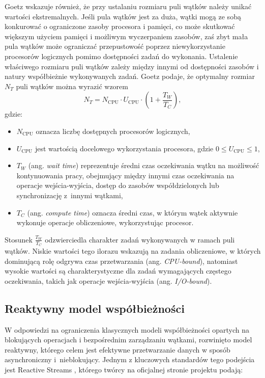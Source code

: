 Goetz wskazuje również, że przy ustalaniu rozmiaru puli wątków należy unikać wartości ekstremalnych. Jeśli pula wątków jest za duża, wątki mogą ze sobą konkurować o ograniczone zasoby procesora i pamięci, co może skutkować większym użyciem pamięci i możliwym wyczerpaniem zasobów, zaś zbyt mała pula wątków może ograniczać przepustowość poprzez niewykorzystanie procesorów logicznych pomimo dostępności zadań do wykonania. Ustalenie właściwego rozmiaru puli wątków zależy między innymi od dostępności zasobów i natury współbieżnie wykonywanych zadań. Goetz podaje, że optymalny rozmiar $N_{T}$ puli wątków można wyrazić wzorem
$$ N_{T} = N_{\text{CPU}} \cdot U_{\text{CPU}} \cdot \left( 1 + \frac{T_W}{T_C} \right), $$
gdzie:
\begin{itemize}
    \itemsep0em
    \item $N_{\text{CPU}}$ oznacza liczbę dostępnych procesorów logicznych,
    \item $U_{\text{CPU}}$ jest wartością docelowego wykorzystania procesora, gdzie $0 \leqslant U_{\text{CPU}} \leqslant 1$,
    \item $T_W$ (ang. \emph{wait time}) reprezentuje średni czas oczekiwania wątku na możliwość kontynuowania pracy, obejmujący między innymi czas oczekiwania na operacje wejścia-wyjścia, dostęp do zasobów współdzielonych lub synchronizację z~innymi wątkami,
    \item $T_C$ (ang. \emph{compute time}) oznacza średni czas, w którym wątek aktywnie wykonuje operacje obliczeniowe, wykorzystując procesor.
\end{itemize}

Stosunek $\frac{T_W}{T_C}$ odzwierciedla charakter zadań wykonywanych w ramach puli wątków. Niskie wartości tego ilorazu wskazują na zadania obliczeniowe, w których dominującą rolę odgrywa czas przetwarzania (ang. \emph{CPU-bound}), natomiast wysokie wartości są charakterystyczne dla zadań wymagających częstego oczekiwania, takich jak operacje wejścia-wyjścia (ang. \emph{I/O-bound}).


\subsection{Reaktywny model współbieżności}
\label{sec:reactive}
W odpowiedzi na ograniczenia klasycznych modeli współbieżności opartych na blokujących operacjach i bezpośrednim zarządzaniu wątkami, rozwinięto model reaktywny, którego celem jest efektywne przetwarzanie danych w sposób asynchroniczny i~nieblokujący. Jednym z kluczowych standardów tego podejścia jest Reactive Streams \cite{reactive-streams-page}, którego twórcy na oficjalnej stronie projektu podają:

